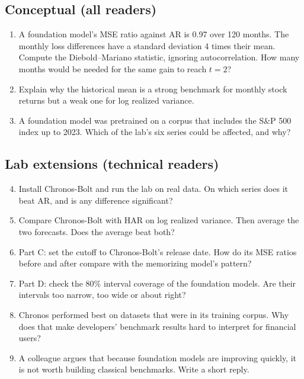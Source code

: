 \subsection*{Conceptual (all readers)}

\begin{enumerate}
  \item A foundation model's MSE ratio against AR is 0.97 over 120 months. The monthly loss differences have a standard deviation 4 times their mean. Compute the Diebold--Mariano statistic, ignoring autocorrelation. How many months would be needed for the same gain to reach $t = 2$?
  \item Explain why the historical mean is a strong benchmark for monthly stock returns but a weak one for log realized variance.
  \item A foundation model was pretrained on a corpus that includes the S\&P 500 index up to 2023. Which of the lab's six series could be affected, and why?
\end{enumerate}

\subsection*{Lab extensions (technical readers)}

\begin{enumerate}
  \setcounter{enumi}{3}
  \item Install Chronos-Bolt and run the lab on real data. On which series does it beat AR, and is any difference significant?
  \item Compare Chronos-Bolt with HAR on log realized variance. Then average the two forecasts. Does the average beat both?
  \item Part C: set the cutoff to Chronos-Bolt's release date. How do its MSE ratios before and after compare with the memorizing model's pattern?
  \item Part D: check the 80\% interval coverage of the foundation models. Are their intervals too narrow, too wide or about right?
  \item Chronos performed best on datasets that were in its training corpus. Why does that make developers' benchmark results hard to interpret for financial users?
  \item A colleague argues that because foundation models are improving quickly, it is not worth building classical benchmarks. Write a short reply.
\end{enumerate}
